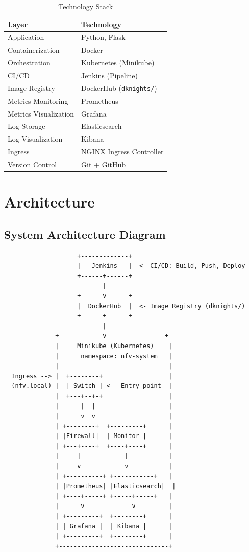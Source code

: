 \documentclass[12pt,a4paper]{article}
\begin{document}
\begin{table}[h]
\centering
\begin{tabular}{@{}ll@{}}
\toprule
\textbf{Layer} & \textbf{Technology} \\
\midrule
Application & Python, Flask \\
Containerization & Docker \\
Orchestration & Kubernetes (Minikube) \\
CI/CD & Jenkins (Pipeline) \\
Image Registry & DockerHub (\texttt{dknights/}) \\
Metrics Monitoring & Prometheus \\
Metrics Visualization & Grafana \\
Log Storage & Elasticsearch \\
Log Visualization & Kibana \\
Ingress & NGINX Ingress Controller \\
Version Control & Git + GitHub \\
\bottomrule
\end{tabular}
\caption{Technology Stack}
\end{table}

\section{Architecture}

\subsection{System Architecture Diagram}

\begin{verbatim}
                    +-------------+
                    |   Jenkins   |  <- CI/CD: Build, Push, Deploy
                    +------+------+
                           |
                    +------v------+
                    |  DockerHub  |  <- Image Registry (dknights/)
                    +------+------+
                           |
              +------------v----------------+
              |     Minikube (Kubernetes)    |
              |      namespace: nfv-system   |
              |                              |
  Ingress --> |  +--------+                  |
  (nfv.local) |  | Switch | <-- Entry point  |
              |  +---+--+-+                  |
              |      |  |                    |
              |      v  v                    |
              | +--------+  +---------+      |
              | |Firewall|  | Monitor |      |
              | +---+----+  +----+----+      |
              |     |            |           |
              |     v            v           |
              | +----------+ +-----------+   |
              | |Prometheus| |Elasticsearch|  |
              | +----+-----+ +-----+-----+   |
              |      v             v         |
              | +---------+  +--------+      |
              | | Grafana |  | Kibana |      |
              | +---------+  +--------+      |
              +------------------------------+
\end{verbatim}
\end{document}
